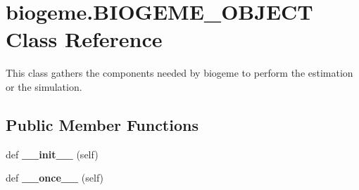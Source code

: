 \hypertarget{classbiogeme_1_1_b_i_o_g_e_m_e___o_b_j_e_c_t}{}\section{biogeme.\+B\+I\+O\+G\+E\+M\+E\+\_\+\+O\+B\+J\+E\+CT Class Reference}
\label{classbiogeme_1_1_b_i_o_g_e_m_e___o_b_j_e_c_t}


This class gathers the components needed by biogeme to perform the estimation or the simulation.  


\subsection*{Public Member Functions}
\begin{DoxyCompactItemize}
\item 
def {\bfseries \+\_\+\+\_\+init\+\_\+\+\_\+} (self)\hypertarget{classbiogeme_1_1_b_i_o_g_e_m_e___o_b_j_e_c_t_a4b5f66b16f6b84ba0a9d2d2c3c9db9d3}{}\label{classbiogeme_1_1_b_i_o_g_e_m_e___o_b_j_e_c_t_a4b5f66b16f6b84ba0a9d2d2c3c9db9d3}

\item 
def {\bfseries \+\_\+\+\_\+once\+\_\+\+\_\+} (self)\hypertarget{classbiogeme_1_1_b_i_o_g_e_m_e___o_b_j_e_c_t_ade77bb7fdb8a1f03d05c7c1f87868c53}{}\label{classbiogeme_1_1_b_i_o_g_e_m_e___o_b_j_e_c_t_ade77bb7fdb8a1f03d05c7c1f87868c53}

\end{DoxyCompactItemize}
